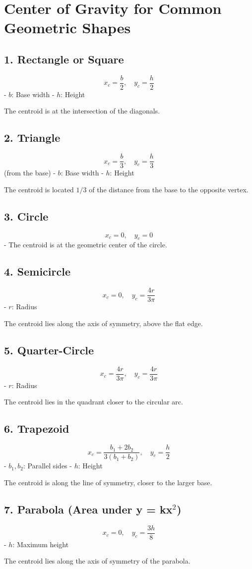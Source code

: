 \documentclass{article}
\begin{document}
\section*{Center of Gravity for Common Geometric Shapes}

\subsection*{1. Rectangle or Square}
\[
x_c = \frac{b}{2}, \quad y_c = \frac{h}{2}
\]
- \(b\): Base width  
- \(h\): Height  

The centroid is at the intersection of the diagonals.

\subsection*{2. Triangle}
\[
x_c = \frac{b}{3}, \quad y_c = \frac{h}{3}
\]
(from the base)
- \(b\): Base width  
- \(h\): Height  

The centroid is located \(1/3\) of the distance from the base to the opposite vertex.

\subsection*{3. Circle}
\[
x_c = 0, \quad y_c = 0
\]
- The centroid is at the geometric center of the circle.

\subsection*{4. Semicircle}
\[
x_c = 0, \quad y_c = \frac{4r}{3\pi}
\]
- \(r\): Radius  

The centroid lies along the axis of symmetry, above the flat edge.

\subsection*{5. Quarter-Circle}
\[
x_c = \frac{4r}{3\pi}, \quad y_c = \frac{4r}{3\pi}
\]
- \(r\): Radius  

The centroid lies in the quadrant closer to the circular arc.

\subsection*{6. Trapezoid}
\[
x_c = \frac{b_1 + 2b_2}{3(b_1 + b_2)}, \quad y_c = \frac{h}{2}
\]
- \(b_1, b_2\): Parallel sides  
- \(h\): Height  

The centroid is along the line of symmetry, closer to the larger base.

\subsection*{7. Parabola (Area under y = kx\(^2\))}
\[
x_c = 0, \quad y_c = \frac{3h}{8}
\]
- \(h\): Maximum height  

The centroid lies along the axis of symmetry of the parabola.
\end{document}
